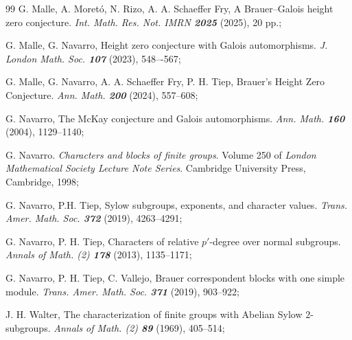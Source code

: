 \documentclass[12pt]{amsart}
\theoremstyle{theorem}
\theoremstyle{definition}
\begin{document}
\begin{thebibliography}{99}
		{\sc G. Malle, A. Moret\'o, N. Rizo, A. A. Schaeffer Fry}, A Brauer--Galois height zero conjecture. \emph{Int. Math. Res. Not. IMRN {\bf 2025}} (2025), 20 pp.;
		
		{\sc G. Malle, G. Navarro}, Height zero conjecture with Galois automorphisms. 
		\emph{J. London Math. Soc. {\bf 107}} (2023), 548–-567;
		
		 {\sc G. Malle, G. Navarro, A. A. Schaeffer Fry, P. H. Tiep}, Brauer’s Height Zero Conjecture. \emph{Ann. Math. {\bf200}} (2024), 557--608;
		
		 {\sc G. Navarro}, The McKay conjecture and Galois automorphisms. \emph{Ann. Math. {\bf160}} (2004), 1129--1140;
		
		 {\sc G. Navarro}. \emph{Characters and blocks of finite groups}. Volume 250 of \emph{London Mathematical Society Lecture Note Series}. Cambridge University Press, Cambridge, 1998;
		
		{\sc G. Navarro, P.H. Tiep}, Sylow subgroups, exponents, and character values. \emph{Trans. Amer. Math. Soc. {\bf 372}} (2019), 4263--4291;
		
		{\sc G. Navarro, P. H. Tiep}, Characters of relative $p'$-degree over
		normal subgroups. \emph{Annals of Math. (2) \bf 178} (2013), 1135--1171;
		
		{\sc G. Navarro, P. H. Tiep, C. Vallejo}, Brauer correspondent blocks with one simple module. \emph{Trans. Amer. Math. Soc. \bf{371}} (2019), 903--922;
		
		{\sc J. H. Walter}, The characterization of finite groups with Abelian Sylow
		$2$-subgroups. \emph{Annals of Math. (2) \bf89} (1969), 405--514;
		
	\end{thebibliography}
\end{document}
